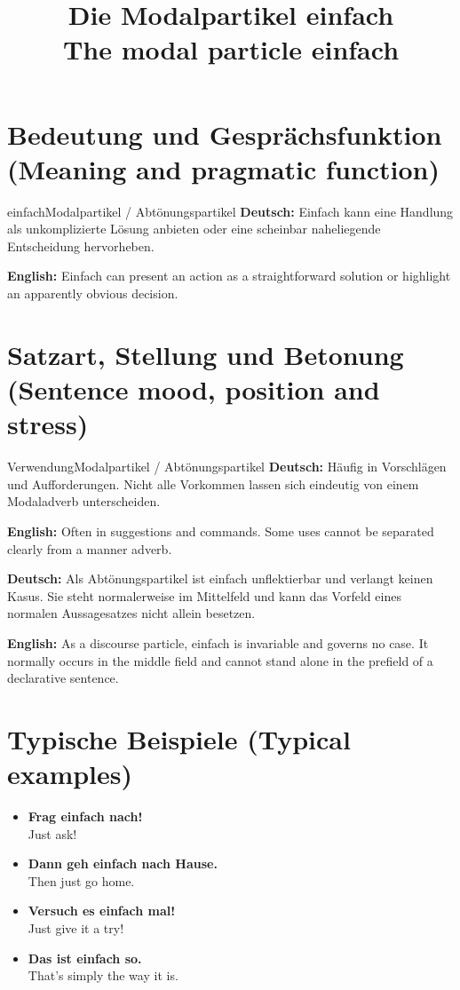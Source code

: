 \documentclass[a4paper,11pt]{article}
\title{Die Modalpartikel \glqq einfach\grqq\\{\large\textnormal{The modal particle einfach}}}
\date{}
\newcommand{\GermanText}[1]{\textbf{Deutsch: }#1\par}
\newcommand{\EnglishText}[1]{{\small\color{SoftGray}\textbf{English: }#1\par}}
\newcommand{\ExampleItem}[2]{\item \textbf{#1}\\{\small\color{SoftGray}#2}}
\begin{document}
\maketitle
\tableofcontents
\section{Bedeutung und Gesprächsfunktion \textnormal{(Meaning and pragmatic function)}}
\begin{grammarentry}{einfach}{Modalpartikel / Abtönungspartikel}
\GermanText{Einfach kann eine Handlung als unkomplizierte Lösung anbieten oder eine scheinbar naheliegende Entscheidung hervorheben.}
\EnglishText{Einfach can present an action as a straightforward solution or highlight an apparently obvious decision.}
\end{grammarentry}
\section{Satzart, Stellung und Betonung \textnormal{(Sentence mood, position and stress)}}
\begin{grammarentry}{Verwendung}{Modalpartikel / Abtönungspartikel}
\GermanText{Häufig in Vorschlägen und Aufforderungen. Nicht alle Vorkommen lassen sich eindeutig von einem Modaladverb unterscheiden.}
\EnglishText{Often in suggestions and commands. Some uses cannot be separated clearly from a manner adverb.}
\end{grammarentry}
\GermanText{Als Abtönungspartikel ist einfach unflektierbar und verlangt keinen Kasus. Sie steht normalerweise im Mittelfeld und kann das Vorfeld eines normalen Aussagesatzes nicht allein besetzen.}
\EnglishText{As a discourse particle, einfach is invariable and governs no case. It normally occurs in the middle field and cannot stand alone in the prefield of a declarative sentence.}
\section{Typische Beispiele \textnormal{(Typical examples)}}
\begin{exbox}\begin{itemize}
\ExampleItem{Frag einfach nach!}{Just ask!}
\ExampleItem{Dann geh einfach nach Hause.}{Then just go home.}
\ExampleItem{Versuch es einfach mal!}{Just give it a try!}
\ExampleItem{Das ist einfach so.}{That's simply the way it is.}
\end{itemize}\end{exbox}
\end{document}
